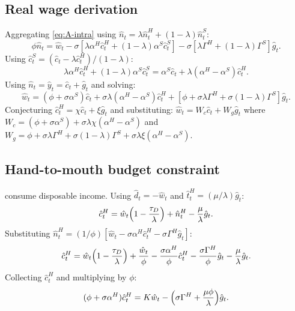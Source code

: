 \subsection{Real wage derivation}\label{app:wage}
Aggregating \eqref{eq:A-intra} using $\hat n_{t}=\lambda\hat n^{H}_{t}+(1-\lambda)\hat n^{S}_{t}$:
\begin{equation}\label{eq:A-wage-1}
  \phi\hat n_{t}=\hat w_{t}-\sigma[\lambda\alpha^{H}\hat c^{H}_{t}+(1-\lambda)\alpha^{S}\hat c^{S}_{t}]
  -\sigma[\lambda\Gamma^{H}+(1-\lambda)\Gamma^{S}]\hat g_{t}.
\end{equation}
Using $\hat c^{S}_{t}=(\hat c_{t}-\lambda\hat c^{H}_{t})/(1-\lambda)$:
\[
  \lambda\alpha^{H}\hat c^{H}_{t}+(1-\lambda)\alpha^{S}\hat c^{S}_{t}
  =\alpha^{S}\hat c_{t}+\lambda(\alpha^{H}-\alpha^{S})\hat c^{H}_{t}.
\]
Using $\hat n_{t}=\hat y_{t}=\hat c_{t}+\hat g_{t}$ and solving:
\begin{equation}\label{eq:A-wage-2}
  \hat w_{t}=(\phi+\sigma\alpha^{S})\hat c_{t}+\sigma\lambda(\alpha^{H}-\alpha^{S})\hat c^{H}_{t}
    +[\phi+\sigma\lambda\Gamma^{H}+\sigma(1-\lambda)\Gamma^{S}]\hat g_{t}.
\end{equation}
Conjecturing $\hat c^{H}_{t}=\chi\hat c_{t}+\xi\hat g_{t}$ and substituting:
$\hat w_{t}=W_{c}\hat c_{t}+W_{g}\hat g_{t}$ where
$W_{c}=(\phi+\sigma\alpha^{S})+\sigma\lambda\chi(\alpha^{H}-\alpha^{S})$ and
$W_{g}=\phi+\sigma\lambda\Gamma^{H}+\sigma(1-\lambda)\Gamma^{S}+\sigma\lambda\xi(\alpha^{H}-\alpha^{S})$.

\subsection{Hand-to-mouth budget constraint}\label{app:htm}
\HtM{} consume disposable income. Using $\hat d_{t}=-\hat w_{t}$ and
$\hat t^{H}_{t}=(\mu/\lambda)\hat g_{t}$:
\begin{equation}\label{eq:A-htm-1}
  \hat c^{H}_{t}=\hat w_{t}\Bigl(1-\frac{\tau_{D}}{\lambda}\Bigr)+\hat n^{H}_{t}-\frac{\mu}{\lambda}\hat g_{t}.
\end{equation}
Substituting $\hat n^{H}_{t}=(1/\phi)[\hat w_{t}-\sigma\alpha^{H}\hat c^{H}_{t}-\sigma\Gamma^{H}\hat g_{t}]$:
\[
  \hat c^{H}_{t}=\hat w_{t}\Bigl(1-\frac{\tau_{D}}{\lambda}\Bigr)
    +\frac{\hat w_{t}}{\phi}-\frac{\sigma\alpha^{H}}{\phi}\hat c^{H}_{t}
    -\frac{\sigma\Gamma^{H}}{\phi}\hat g_{t}-\frac{\mu}{\lambda}\hat g_{t}.
\]
Collecting $\hat c^{H}_{t}$ and multiplying by $\phi$:
\begin{equation}\label{eq:A-htm-2}
  (\phi+\sigma\alpha^{H})\hat c^{H}_{t}=K\hat w_{t}-\Bigl(\sigma\Gamma^{H}+\frac{\mu\phi}{\lambda}\Bigr)\hat g_{t}.
\end{equation}

